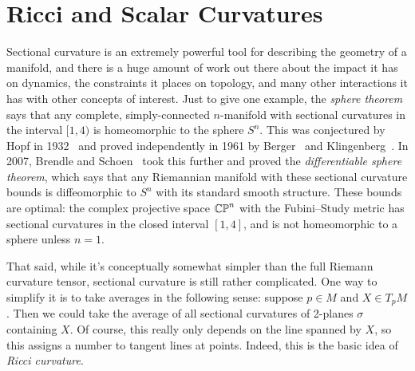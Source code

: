 
\section{Ricci and Scalar Curvatures}
\label{sec:Ricci and scalar curvatures}

Sectional curvature is an extremely powerful tool for describing the geometry of a manifold, and there is a huge amount of work out there about the impact it has on dynamics, the constraints it places on topology, and many other interactions it has with other concepts of interest. Just to give one example, the \emph{sphere theorem} says that any complete, simply-connected $n$-manifold with sectional curvatures in the interval $[1,4)$ is homeomorphic to the sphere $S^n$. This was conjectured by Hopf in 1932~\cite{hopfDifferentialgeometrieUndTopologische1932} and proved independently in 1961 by Berger~\cite{bergerVarietesRiemanniennesHomogenes1961} and Klingenberg~\cite{klingenbergUeberRiemannscheMannigfaltigkeiten1961}. In 2007, Brendle and Schoen~\cite{brendleManifolds14pinched2008} took this further and proved the \emph{differentiable sphere theorem}, which says that any Riemannian manifold with these sectional curvature bounds is diffeomorphic to $S^n$ with its standard smooth structure. These bounds are optimal: the complex projective space $\mathbb{CP}^n$ with the Fubini–Study metric has sectional curvatures in the closed interval $[1,4]$, and is not homeomorphic to a sphere unless $n=1$.

That said, while it's conceptually somewhat simpler than the full Riemann curvature tensor, sectional curvature is still rather complicated. One way to simplify it is to take averages in the following sense: suppose $p \in M$ and $X \in T_pM$. Then we could take the average of all sectional curvatures of 2-planes $\sigma$ containing $X$. Of course, this really only depends on the line spanned by $X$, so this assigns a number to tangent lines at points. Indeed, this is the basic idea of \emph{Ricci curvature}.

